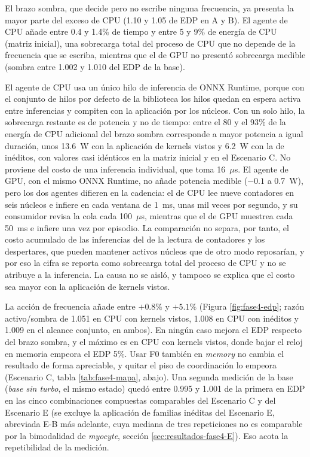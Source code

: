 El brazo sombra, que decide pero no escribe ninguna frecuencia, ya presenta la mayor parte del exceso de CPU (1.10 y 1.05 de EDP en A y B). El agente de CPU añade entre 0.4 y 1.4\% de tiempo y entre 5 y 9\% de energía de CPU (matriz inicial), una sobrecarga total del proceso de CPU que no depende de la frecuencia que se escriba, mientras que el de GPU no presentó sobrecarga medible (sombra entre 1.002 y 1.010 del EDP de la base).

El agente de CPU usa un único hilo de inferencia de ONNX Runtime, porque con el conjunto de hilos por defecto de la biblioteca los hilos quedan en espera activa entre inferencias y compiten con la aplicación por los núcleos. Con un solo hilo, la sobrecarga restante es de potencia y no de tiempo: entre el 80 y el 93\% de la energía de CPU adicional del brazo sombra corresponde a mayor potencia a igual duración, unos 13.6~W con la aplicación de kernels vistos y 6.2~W con la de inéditos, con valores casi idénticos en la matriz inicial y en el Escenario C. No proviene del costo de una inferencia individual, que toma 16~$\mu$s. El agente de GPU, con el mismo ONNX Runtime, no añade potencia medible ($-0.1$ a 0.7~W), pero los dos agentes difieren en la cadencia: el de CPU lee nueve contadores en seis núcleos e infiere en cada ventana de 1~ms, unas mil veces por segundo, y su consumidor revisa la cola cada 100~$\mu$s, mientras que el de GPU muestrea cada 50~ms e infiere una vez por episodio. La comparación no separa, por tanto, el costo acumulado de las inferencias del de la lectura de contadores y los despertares, que pueden mantener activos núcleos que de otro modo reposarían, y por eso la cifra se reporta como sobrecarga total del proceso de CPU y no se atribuye a la inferencia. La causa no se aisló, y tampoco se explica que el costo sea mayor con la aplicación de kernels vistos.

La acción de frecuencia añade entre $+0.8\%$ y $+5.1\%$ (Figura \ref{fig:fase4-edp}; razón activo/sombra de 1.051 en CPU con kernels vistos, 1.008 en CPU con inéditos y 1.009 en el alcance conjunto, en ambos). En ningún caso mejora el EDP respecto del brazo sombra, y el máximo es en CPU con kernels vistos, donde bajar el reloj en memoria empeora el EDP 5\%. Usar F0 también en \textit{memory} no cambia el resultado de forma apreciable, y quitar el piso de coordinación lo empeora (Escenario C, tabla \ref{tab:fase4-mapa}, abajo). Una segunda medición de la base (\textit{base sin turbo}, el mismo estado) quedó entre 0.995 y 1.001 de la primera en EDP en las cinco combinaciones compuestas comparables del Escenario C y del Escenario E (se excluye la aplicación de familias inéditas del Escenario E, abreviada E-B más adelante, cuya mediana de tres repeticiones no es comparable por la bimodalidad de \textit{myocyte}, sección \ref{sec:resultados-fase4-E}). Eso acota la repetibilidad de la medición.

